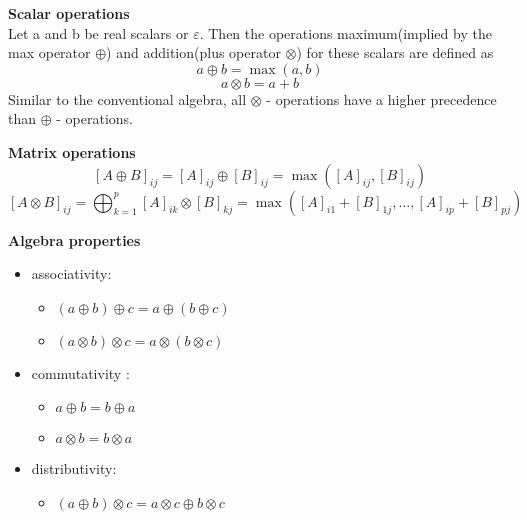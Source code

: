 \documentclass{book}
\begin{document}
\textbf{Scalar operations}\\
Let a and b be real scalars or $\varepsilon$.
Then the operations maximum(implied by the max operator $\oplus$) and addition(plus operator $\otimes$) for these scalars are defined as
$$ a \oplus b = \max(a,b) $$
$$ a \otimes b = a + b $$
Similar to the conventional algebra, all $\otimes$ - operations have a higher precedence than $\oplus$ - operations.

\textbf{Matrix operations}\\
$$ [A \oplus B]_{ij} = [A]_{ij} \oplus [B]_{ij} = \max([A]_{ij} , [B]_{ij}) $$
$$ [A \otimes B]_{ij} = \bigoplus_{k = 1}^p [A]_{ik} \otimes [B]_{kj} = \max([A]_{i1} + [B]_{1j}, \dots, [A]_{ip} + [B]_{pj}) $$

\textbf{Algebra properties}\\
\begin{itemize}
\item associativity:
	\begin{itemize}
	\item $(a \oplus b) \oplus c = a \oplus (b \oplus c) $
	\item $(a\otimes b) \otimes c = a \otimes (b \otimes c)$
	\end{itemize}
\item commutativity :
	\begin{itemize}
	\item $a \oplus b = b \oplus a $
	\item $a \otimes b = b \otimes a $
	\end{itemize}
\item distributivity:
	\begin{itemize}
	\item  $(a \oplus b) \otimes c = a \otimes c \oplus b \otimes c $
	\end{itemize}
\end{itemize}
\end{document}
